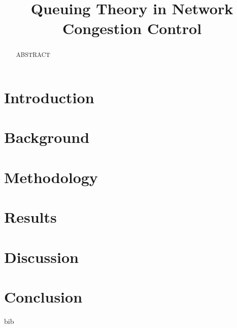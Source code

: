 \documentclass[conference]{IEEEtran}
\begin{document}
\title{Queuing Theory in Network Congestion Control}

\author{
}

\maketitle
\thispagestyle{plain}
\pagestyle{plain}

\begin{abstract}
    ABSTRACT
\end{abstract}


\section{Introduction}


\section{Background}


\section{Methodology}


\section{Results}


\section{Discussion}


\section{Conclusion}


\begin{thebibliography}{00}
 bib
\end{thebibliography}

\end{document}
